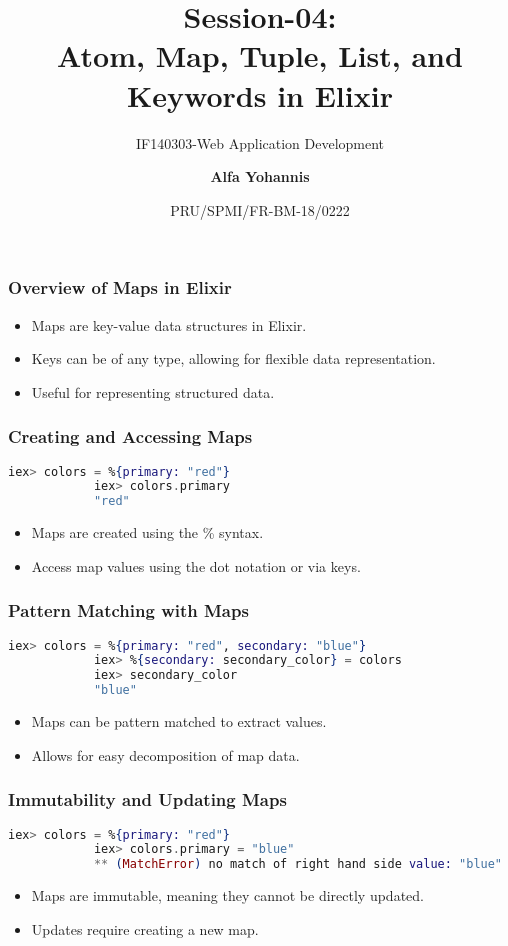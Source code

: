 \documentclass[aspectratio=169, table]{beamer}
\subtitle{IF140303-Web Application Development}
\title{\LARGE{Session-04:\\Atom, Map, Tuple, List, and\\Keywords in Elixir}
	}
\date[Serial]{\scriptsize {PRU/SPMI/FR-BM-18/0222}}
\author[Pradita]{\small{\textbf{Alfa Yohannis}}}
\begin{document}
	
	\frame{\titlepage}
	
	\begin{frame}
		\frametitle{Overview of Maps in Elixir}
		\begin{itemize}
			\item Maps are key-value data structures in Elixir.
			\item Keys can be of any type, allowing for flexible data representation.
			\item Useful for representing structured data.
		\end{itemize}
	\end{frame}
	
	\begin{frame}[fragile]
		\frametitle{Creating and Accessing Maps}
		\begin{lstlisting}[language=Elixir]
			iex> colors = %{primary: "red"}
			iex> colors.primary
			"red"
		\end{lstlisting}
		\begin{itemize}
			\item Maps are created using the \%{} syntax.
			\item Access map values using the dot notation or via keys.
		\end{itemize}
	\end{frame}
	
	\begin{frame}[fragile]
		\frametitle{Pattern Matching with Maps}
		\begin{lstlisting}[language=Elixir]
			iex> colors = %{primary: "red", secondary: "blue"}
			iex> %{secondary: secondary_color} = colors
			iex> secondary_color
			"blue"
		\end{lstlisting}
		\begin{itemize}
			\item Maps can be pattern matched to extract values.
			\item Allows for easy decomposition of map data.
		\end{itemize}
	\end{frame}
	
	\begin{frame}[fragile]
		\frametitle{Immutability and Updating Maps}
		\begin{lstlisting}[language=Elixir]
			iex> colors = %{primary: "red"}
			iex> colors.primary = "blue"
			** (MatchError) no match of right hand side value: "blue"
		\end{lstlisting}
		\begin{itemize}
			\item Maps are immutable, meaning they cannot be directly updated.
			\item Updates require creating a new map.
		\end{itemize}
	\end{frame}
	
\end{document}
